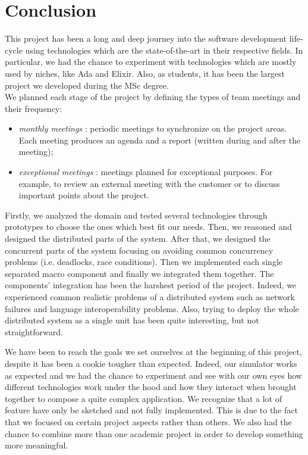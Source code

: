 \section{Conclusion}



This project has been a long and deep journey into the software development life-cycle
using technologies which are the state-of-the-art in their respective fields.
In particular, we had the chance to experiment
with technologies which are mostly used by
niches, like Ada and Elixir.
Also, as students, it has been the largest project we developed during the MSc degree.
\\

We planned each stage of the project by defining the
types of team meetings and their frequency:
\begin{itemize}
	\item \textit{monthly meetings} : periodic meetings to synchronize on the
	project areas. Each meeting produces an agenda and a report
	(written during and after the meeting);
	\item \textit{exceptional meetings} : meetings planned
	for exceptional purposes.
	For example, to review an external meeting with the customer
	or to discuss important points about the project.
\end{itemize}

Firstly, we analyzed the domain and tested several technologies through
prototypes to choose the ones which best fit our needs.
Then, we reasoned and designed the distributed parts of the system.
After that, we designed the concurrent parts of the system focusing
on avoiding common concurrency problems (i.e. deadlocks, race conditions).
Then we implemented each single separated macro component
and finally we integrated
them together. The components' integration has been
the harshest period of the project.
Indeed, we experienced common realistic problems of
a distributed system such as network failures and language interoperability
problems. Also, trying to deploy the whole distributed system as a single unit
has been quite interesting, but not straightforward.

We have been to reach the goals we set ourselves at the beginning of this
project, despite it has been a cookie tougher than expected.
Indeed, our simulator works as expected and we had the chance to experiment
and see with our own eyes how different technologies work under the hood and
how they interact when brought
together to compose a quite complex application.
We recognize that a lot of feature have only be sketched and not fully
implemented. This is due to the fact that we focused on certain project aspects
rather than others.
We also had the chance to combine more than one academic project in order to
develop something more meaningful.


